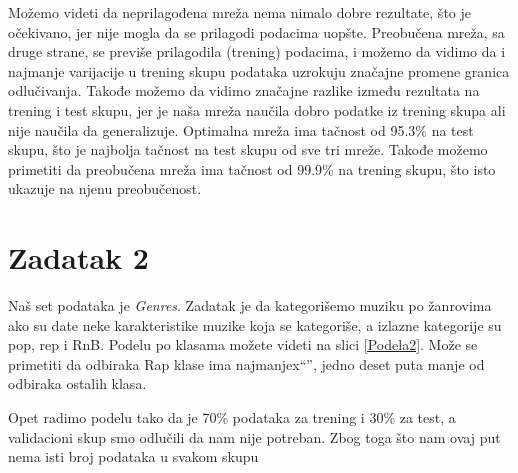 \documentclass[10pt,a4paper,titlepage,croatian]{article}
\begin{document}
Možemo videti da neprilagođena mreža nema nimalo dobre rezultate, što je očekivano, jer nije mogla da se prilagodi podacima uopšte. Preobučena mreža, sa druge strane, se previše prilagodila (trening) podacima, i možemo da vidimo da i najmanje varijacije u trening skupu podataka uzrokuju značajne promene granica odlučivanja. Takođe možemo da vidimo značajne razlike između rezultata na trening i test skupu, jer je naša mreža naučila dobro podatke iz trening skupa ali nije naučila da generalizuje. Optimalna mreža ima tačnost od 95.3\% na test skupu, što je najbolja tačnost na test skupu od sve tri mreže. Takođe možemo primetiti da preobučena mreža ima tačnost od 99.9\% na trening skupu, što isto ukazuje na njenu preobučenost.

\section{Zadatak 2}
Naš set podataka je \textit{Genres}. Zadatak je da kategorišemo muziku po žanrovima ako su date neke karakteristike muzike koja se kategoriše, a izlazne kategorije su pop, rep i RnB. Podelu po klasama možete videti na slici \ref{Podela2}. Može se primetiti da odbiraka Rap klase ima najmanjex``'', jedno deset puta manje od odbiraka ostalih klasa.

Opet radimo podelu tako da je 70\% podataka za trening i 30\% za test, a validacioni skup smo odlučili da nam nije potreban. Zbog toga što nam ovaj put nema isti broj podataka u svakom skupu
\end{document}
